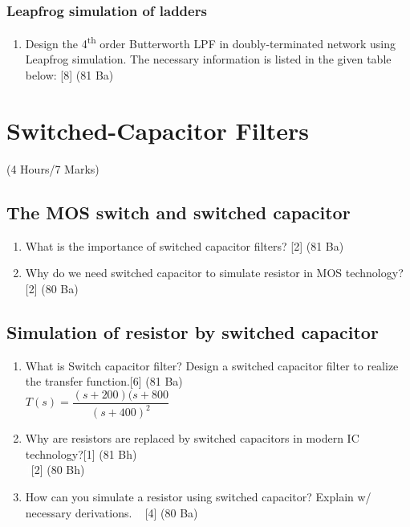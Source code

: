 \documentclass[12pt]{article}
\newcommand{\enter}{\\\textcolor{white}{1}}
\begin{document}
\subsubsection{Leapfrog simulation of ladders}
\begin{enumerate}
\item Design the 4\textsuperscript{th} order Butterworth LPF in doubly-terminated network using Leapfrog simulation. The necessary information is listed in the given table below:\hspace*{20mm} [8] (81 Ba)\\

\end{enumerate}

\pagebreak
\section{Switched-Capacitor Filters}
\begin{center}(4 Hours/7 Marks)\end{center}
\subsection{The MOS switch and switched capacitor}
\begin{enumerate}
	\item What is the importance of switched capacitor filters? \hfill [2] (81 Ba)

\item Why do we need switched capacitor to simulate resistor in MOS technology?\hfill[2] (80 Ba)
\end{enumerate}
\subsection{Simulation of resistor by switched capacitor}
\begin{enumerate}
\item What is Switch capacitor filter? Design a switched capacitor filter to realize the transfer function.\hfill [6] (81 Ba)\\
$T(s) = \dfrac{(s+200)(s+800}{(s+400)^2}$
\item Why are resistors are replaced by switched capacitors in modern IC technology?\hfill[1] (81 Bh)
\enter\hfill [2] (80 Bh)
\item How can you simulate a resistor using switched capacitor? Explain w/ necessary derivations.
\textcolor{white}{1} \hfill[4] (80 Ba)

\end{enumerate}
\end{document}
